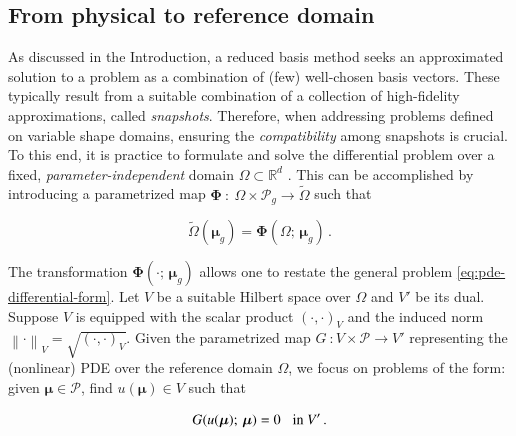 \documentclass[longtitle]{elsarticle}
\numberwithin{equation}{section}
\theoremstyle{theorem}
\theoremstyle{definition}
\theoremstyle{remark}
\theoremstyle{proposition}
\numberwithin{figure}{section}
\newcommand{\norm}[1]{\left\lVert#1\right\rVert}
\newcommand{\wt}[1]{\widetilde{#1}}
\newcommand{\bg}[1]{\boldsymbol{#1}}
\begin{document}
		
	\subsection{From physical to reference domain}
	\label{section:From physical to reference domain}

		As discussed in the Introduction, a reduced basis method seeks an approximated solution to a problem as a combination of (few) well-chosen basis vectors. These typically result from a suitable combination of a collection of high-fidelity approximations, called \emph{snapshots}. Therefore, when addressing problems defined on variable shape domains, ensuring the \emph{compatibility} among snapshots is crucial. To this end, it is practice to formulate and solve the differential problem over a fixed, \emph{parameter-independent} domain $\Omega \subset \mathbb{R}^d$ \cite{MN16}. This can be accomplished by introducing a parametrized map $\bg{\Phi} ~ : ~ \Omega \times \mathcal{P}_g \rightarrow \wt{\Omega}$ such that
		\begin{linenomath}\begin{linenomath}\begin{equation*}
			\wt{\Omega}(\bg{\mu}_g) = \bg{\Phi}(\Omega; \, \bg{\mu}_g) \, .
		\end{equation*}\end{linenomath}\end{linenomath}
		The transformation $\bg{\Phi}(\cdot; \, \bg{\mu}_g)$ allows one to restate the general problem \eqref{eq:pde-differential-form}. Let $V$ be a suitable Hilbert space over $\Omega$ and $V'$ be its dual. Suppose $V$ is equipped with the scalar product $(\cdot, \cdot)_V$ and the induced norm $\norm{\cdot}_V = \sqrt{(\cdot, \cdot)_V}$. Given the parametrized map $G ~ : V \times \mathcal{P} \rightarrow V'$ representing the (nonlinear) PDE over the reference domain $\Omega$, we focus on problems of the form: given $\bg{\mu} \in \mathcal{P}$, find $u(\bg{\mu}) \in V$ such that
		\begin{linenomath}\begin{linenomath}\begin{equation}
			\label{eq:pde-differential-reference}
			G(u(\bg{\mu}); \, \bg{\mu}) = 0 \hspace*{0.3cm} \text{in $V'$} \, .
		\end{equation}\end{linenomath}\end{linenomath}
\end{document}
